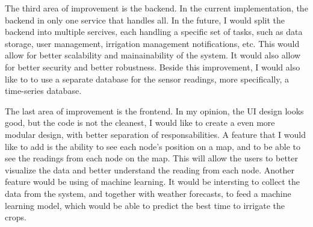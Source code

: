 The third area of improvement is the backend. In the current implementation, the backend in only
one service that handles all. In the future, I would split the backend into multiple sercives,
each handling a specific set of tasks, such as data storage, user management, irrigation management
notifications, etc. This would allow for better scalability and mainainability of the system. It would
also allow for better security and better robustness. Beside this improvement, I would also like to
to use a separate database for the sensor readings, more specifically, a time-series database.

The last area of improvement is the frontend. In my opinion, the UI design looks good, but the code 
is not the cleanest, I would like to create a even more modular design, with better separation of responsabilities.
A feature that I would like to add is the ability to see each node's position on a map,
and to be able to see the readings from each node on the map. This will allow the users
to better visualize the data and better understand the reading from each node. 
Another feature would be using of machine learning. It would be intersting to collect the data from the system,
and together with weather forecasts, to feed a machine learning model, 
which would be able to predict the best time to irrigate the crops.
